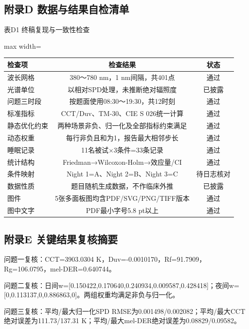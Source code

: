 \documentclass[UTF8,a4paper,12pt]{ctexart}
\begin{document}
\subsection{附录D  数据与结果自检清单}

表D1  终稿复现与一致性检查

\begin{table}[H]
\centering
\small
\begin{adjustbox}{max width=\textwidth}
\begin{tabular}{lcc}
\toprule
检查项 & 检查结果 & 状态 \\
\midrule
波长网格 & 380～780 nm，1 nm间隔，共401点 & 通过 \\
光谱单位 & 以相对SPD处理，未推断绝对辐照度 & 已披露 \\
问题三时段 & 按题面使用08:30～19:30，共12时刻 & 通过 \\
标准指标 & CCT/Duv、TM-30、CIE S 026统一计算 & 通过 \\
静态优化约束 & 两种场景非负、归一化及全部指标约束满足 & 通过 \\
动态权重 & 每行非负且和为1，报告最大相邻步长 & 通过 \\
睡眠记录 & 11名被试×3条件=33条记录 & 通过 \\
统计结构 & Friedman→Wilcoxon-Holm→效应量/CI & 通过 \\
条件映射 & Night 1=A、Night 2=B、Night 3=C & 待日志核对 \\
数据性质 & 题目随机生成数据，不作临床外推 & 已披露 \\
图件 & 5张多面板图均含PDF/SVG/PNG/TIFF版本 & 通过 \\
图中文字 & PDF最小字号5.8 pt以上 & 通过 \\
\bottomrule
\end{tabular}
\end{adjustbox}
\end{table}

\subsection{附录E  关键结果复核摘要}

问题一复核：CCT=3903.0304 K，Duv=-0.0010170，Rf=91.7909，Rg=106.0795，mel-DER=0.640744。

问题二复核：日间w=[0.150422,0.170640,0.240934,0.009587,0.428418]；夜间w=[0,0.113137,0,0.886863,0]。两组权重均满足非负与归一化。

问题三复核：平均/最大归一化SPD RMSE为0.001498/0.002082；平均/最大CCT绝对误差为111.73/137.31 K；平均/最大mel-DER绝对误差为0.08829/0.09582。
\end{document}
